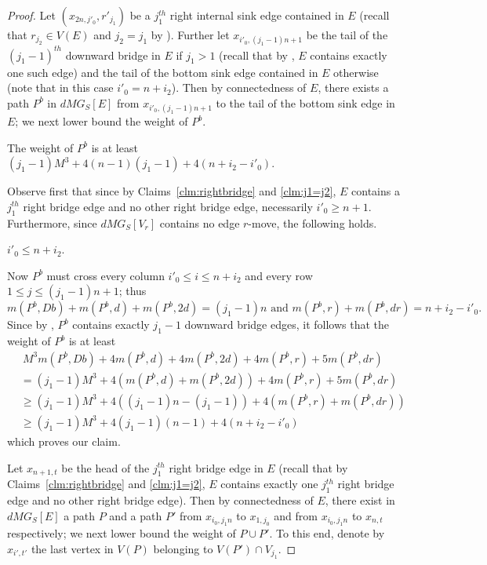 \begin{proof}
Let $(x_{2n,j'_0},r'_{j_1})$ be a $j_1^{th}$ right internal sink edge contained in $E$ (recall that $r_{j_2} \in V(E)$ and $j_2 = j_1$ by ). Further let $x_{i'_0,(j_1-1)n+1}$ be the tail of the $(j_1-1)^{th}$ downward bridge in $E$ if $j_1 >1$ (recall that by , $E$ contains exactly one such edge) and the tail of the bottom sink edge contained in $E$ otherwise (note that in this case $i'_0 = n + i_2$). Then by connectedness of $E$, there exists a path $P^b$ in $dMG_S[E]$ from $x_{i'_0,(j_1-1)n+1}$ to the tail of the bottom sink edge in $E$; we next lower bound the weight of $P^b$.

\begin{claim}
\label{clm:weightPb}
The weight of $P^b$ is at least $(j_1-1)M^3 + 4(n -1)(j_1-1) + 4(n + i_2 - i'_0)$.
\end{claim}

\begin{claimproof}
Observe first that since by Claims~\ref{clm:rightbridge} and \ref{clm:j1=j2}, $E$ contains a $j_1^{th}$ right bridge edge and no other right bridge edge, necessarily $i'_0 \geq n+1$. Furthermore, since $dMG_S[V_r]$ contains no edge $r$-move, the following holds.

\begin{observation}
\label{obs:i'0}
$i'_0 \leq n+i_2$. 
\end{observation}

\noindent
Now $P^b$ must cross every column $i'_0 \leq i \leq n + i_2$ and every row $1 \leq j \leq (j_1-1)n+1$; thus 
\[
m(P^b,Db) + m(P^b,d) + m(P^b,2d) = (j_1-1)n \text{ and } m(P^b,r) + m(P^b,dr) = n + i_2 - i'_0.
\]
Since by , $P^b$ contains exactly $j_1-1$ downward bridge edges, it follows that the weight of $P^b$ is at least 
\begin{equation*}
\begin{split}
&~M^3m(P^b,Db) + 4m(P^b,d) + 4m(P^b,2d) + 4m(P^b,r) + 5m(P^b,dr)\\
&= (j_1-1)M^3 + 4(m(P^b,d) + m(P^b,2d)) + 4m(P^b,r) + 5m(P^b,dr)\\
& \geq (j_1-1)M^3 + 4((j_1-1)n - (j_1-1)) + 4(m(P^b,r) + m(P^b,dr))\\
& \geq (j_1-1)M^3 + 4(j_1-1)(n - 1) + 4(n + i_2 - i'_0)
\end{split}
\end{equation*}
which proves our claim.
\end{claimproof}

Let $x_{n+1,t}$ be the head of the $j_1^{th}$ right bridge edge in $E$ (recall that by Claims~\ref{clm:rightbridge} and \ref{clm:j1=j2}, $E$ contains exactly one $j_1^{th}$ right bridge edge and no other right bridge edge). Then by connectedness of $E$, there exist in $dMG_S[E]$ a path $P$ and a path $P'$ from $x_{i_0,j_1n}$ to $x_{1,j_0}$ and from $x_{i_0,j_1n}$ to $x_{n,t}$ respectively; we next lower bound the weight of $P \cup P'$. To this end, denote by $x_{i',t'}$ the last vertex in $V(P)$ belonging to $V(P') \cap V_{j_1}$. 


\end{proof}
